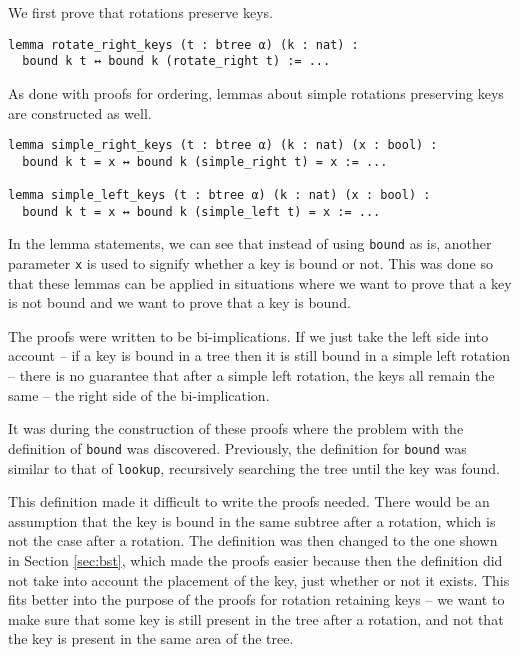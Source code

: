 We first prove that rotations preserve keys.

\begin{lstlisting}
lemma rotate_right_keys (t : btree α) (k : nat) :
  bound k t ↔ bound k (rotate_right t) := ...
\end{lstlisting}

As done with proofs for ordering, lemmas about simple rotations preserving keys are constructed as well.

\begin{lstlisting}
lemma simple_right_keys (t : btree α) (k : nat) (x : bool) :
  bound k t = x ↔ bound k (simple_right t) = x := ...
  
lemma simple_left_keys (t : btree α) (k : nat) (x : bool) :
  bound k t = x ↔ bound k (simple_left t) = x := ...
\end{lstlisting}

In the lemma statements, we can see that instead of using \lstinline{bound} as is, another parameter \lstinline{x} is used to signify whether a key is bound or not. This was done so that these lemmas can be applied in situations where we want to prove that a key is not bound and we want to prove that a key is bound.

The proofs were written to be bi-implications. If we just take the left side into account -- if a key is bound in a tree then it is still bound in a simple left rotation -- there is no guarantee that after a simple left rotation, the keys all remain the same -- the right side of the bi-implication. 

It was during the construction of these proofs where the problem with the definition of \lstinline{bound} was discovered. Previously, the definition for \lstinline{bound} was similar to that of \lstinline{lookup}, recursively searching the tree until the key was found.

This definition made it difficult to write the proofs needed. There would be an assumption that the key is bound in the same subtree after a rotation, which is not the case after a rotation. The definition was then changed to the one shown in Section \ref{sec:bst}, which made the proofs easier because then the definition did not take into account the placement of the key, just whether or not it exists. This fits better into the purpose of the proofs for rotation retaining keys -- we want to make sure that some key is still present in the tree after a rotation, and not that the key is present in the same area of the tree.